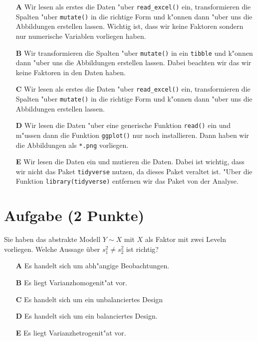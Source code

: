 \documentclass[a4paper, 9pt]{scrartcl}\usepackage[]{graphicx}\usepackage[]{xcolor}
\begin{document}
\begin{enumerate}
\item [\textbf{A} \msquare] Wir lesen als erstes die Daten {"u}ber \texttt{read\_excel()} ein, transformieren die Spalten {"u}ber \texttt{mutate()} in die richtige Form und k{"o}nnen dann  {"u}ber  uns die Abbildungen erstellen lassen. Wichtig ist, dass wir keine Faktoren sondern nur numerische Variablen vorliegen haben.
\item [\textbf{B} \msquare] Wir transformieren die Spalten {"u}ber \texttt{mutate()} in ein \texttt{tibble} und k{"o}nnen dann {"u}ber  uns die Abbildungen erstellen lassen. Dabei beachten wir das wir keine Faktoren in den Daten haben.
\item [\textbf{C} \msquare] Wir lesen als erstes die Daten {"u}ber \texttt{read\_excel()} ein, transformieren die Spalten {"u}ber \texttt{mutate()} in die richtige Form und k{"o}nnen dann {"u}ber  uns die Abbildungen erstellen lassen.
\item [\textbf{D} \msquare] Wir lesen die Daten {"u}ber eine generische Funktion \texttt{read()} ein und m{"u}ssen dann die Funktion \texttt{ggplot()} nur noch installieren. Dann haben wir die Abbildungen als \texttt{*.png} vorliegen.
\item [\textbf{E} \msquare] Wir lesen die Daten ein und mutieren die Daten. Dabei ist wichtig, dass wir nicht das Paket \texttt{tidyverse} nutzen, da dieses Paket veraltet ist. {"U}ber die Funktion \texttt{library(tidyverse)} entfernen wir das Paket von der Analyse.
\end{enumerate}

\section{Aufgabe \hfill (2 Punkte)}




Sie haben das abstrakte Modell $Y \sim X$ mit $X$ als Faktor mit zwei
Leveln vorliegen. Welche Aussage {\"u}ber $s^2_1 \neq s^2_2$ ist richtig?



\begin{enumerate}
\item [\textbf{A} \msquare] Es handelt sich um abh{"a}ngige Beobachtungen.
\item [\textbf{B} \msquare] Es liegt Varianzhomogenit{"a}t vor.
\item [\textbf{C} \msquare] Es handelt sich um ein unbalanciertes Design
\item [\textbf{D} \msquare] Es handelt sich um ein balanciertes Design.
\item [\textbf{E} \msquare] Es liegt Varianzhetrogenit{"a}t vor.
\end{enumerate}
\end{document}
